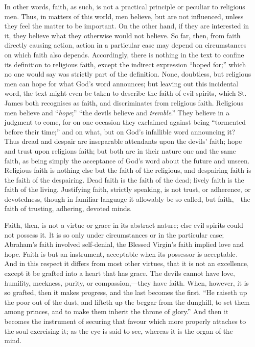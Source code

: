 In other words, faith, as such, is not a practical principle or
peculiar to religious men. Thus, in matters of this world, men
believe, but are not influenced, unless they feel the matter to be
important. On the other hand, if they are interested in it, they
believe what they otherwise would not believe. So far, then, from
faith directly causing action, action in a particular case may depend
on circumstances on which faith also depends. Accordingly, there is
nothing in the text to confine its definition to religious faith,
except the indirect expression ``hoped for;'' which no one
would say was strictly part of the definition. None, doubtless, but
religious men can hope for what God's word announces; but leaving out
this incidental word, the text might even be taken to describe the
faith of evil spirits, which St. James both recognises as faith, and
discriminates from religious faith. Religious men believe and
``\emph{hope};'' ``the devils believe and \emph{tremble}.''
They believe in a judgment to come, for on one occasion they exclaimed
against being ``tormented before their time;'' and on what,
but on God's infallible word announcing it? Thus dread and despair are
inseparable attendants upon the devils' faith; hope and trust upon
religions faith; but both are in their nature one and the same faith,
as being simply the acceptance of God's word about the future and
unseen. Religious faith is nothing else but the faith of the
religious, and despairing faith is the faith of the despairing. Dead
faith is the faith of the dead; lively faith is the faith of the
living. Justifying faith, strictly speaking, is not trust, or
adherence, or devotedness, though in familiar language it allowably be
so called, but faith,—the faith of trusting, adhering, devoted
minds.

Faith, then, is not a virtue or grace in its abstract nature; else
evil spirits could not possess it. It is so only under circumstances
or in the particular case; Abraham's faith involved self-denial, the
Blessed Virgin's faith implied love and hope. Faith is but an
instrument, acceptable when its possessor is acceptable. And in this
respect it differs from most other virtues, that it is not an
excellence, except it be grafted into a heart that has grace. The
devils cannot have love, humility, meekness, purity, or compassion,—they
have faith. When, however, it is so grafted, then it makes progress,
and the last becomes the first. ``He raiseth up the poor out of
the dust, and lifteth up the beggar from the dunghill, to set them
among princes, and to make them inherit the throne of glory.'' And
then it becomes the instrument of securing that favour which
more properly attaches to the soul exercising it; as the eye is said
to see, whereas it is the organ of the mind.

